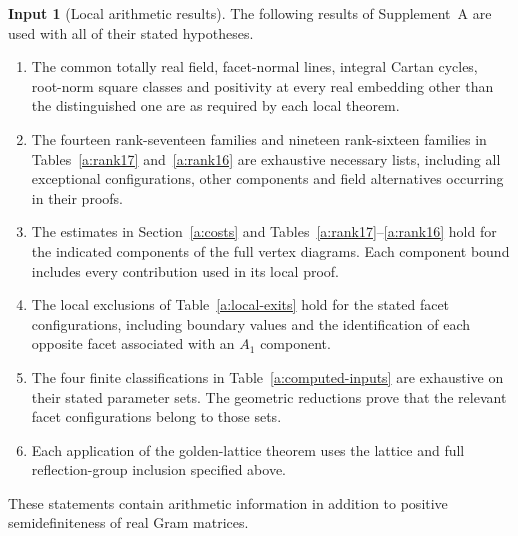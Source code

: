 \documentclass[11pt]{article}
\theoremstyle{definition}
\newtheorem{assumption}[theorem]{Input}
\theoremstyle{remark}
\numberwithin{equation}{section}
\begin{document}
\begin{assumption}[Local arithmetic results]
\label{a:input-package}
The following results of Supplement~A are used with all of their
stated hypotheses.
\begin{enumerate}[label=\textup{(\roman*)},leftmargin=*]
\item The common totally real field, facet-normal lines, integral
 Cartan cycles, root-norm square classes and positivity at every
 real embedding other than the distinguished one are as required by each local theorem.
\item The fourteen rank-seventeen families and nineteen rank-sixteen
 families in Tables~\ref{a:rank17} and~\ref{a:rank16} are exhaustive
 necessary lists, including all exceptional configurations, other
 components and field alternatives occurring in their proofs.
\item The estimates in Section~\ref{a:costs} and
 Tables~\ref{a:rank17}--\ref{a:rank16} hold for the indicated
 components of the full vertex diagrams. Each component bound includes
 every contribution used in its local proof.
\item The local exclusions of Table~\ref{a:local-exits} hold for the
 stated facet configurations, including boundary values and the
 identification of each opposite facet associated with an $A_1$ component.
\item The four finite classifications in
 Table~\ref{a:computed-inputs} are exhaustive on their stated
 parameter sets. The geometric reductions prove that the relevant
 facet configurations belong to those sets.
\item Each application of the golden-lattice theorem uses the lattice
 and full reflection-group inclusion specified above.
\end{enumerate}
\end{assumption}

These statements contain arithmetic information in addition to
positive semidefiniteness of real Gram matrices.
\end{document}
